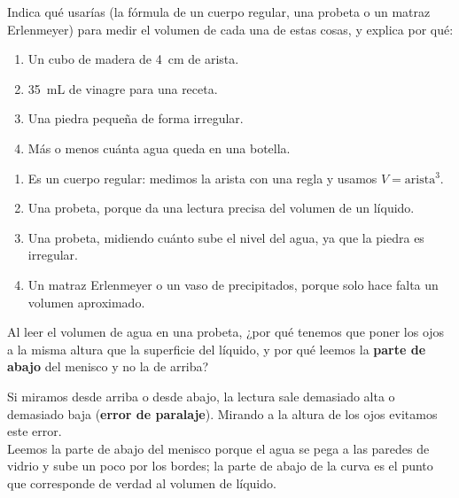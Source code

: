 \begin{exercise}
    Indica qué usarías (la fórmula de un cuerpo regular, una probeta o un matraz Erlenmeyer) para medir el volumen de cada una de estas cosas, y explica por qué:
    \begin{enumerate}[label=\letraminuscula]
        \item Un cubo de madera de \qty{4}{\cm} de arista.
        \item \qty{35}{\mL} de vinagre para una receta.
        \item Una piedra pequeña de forma irregular.
        \item Más o menos cuánta agua queda en una botella.
    \end{enumerate}
    \begin{solu}
        \begin{enumerate}[label=\alph*)]
            \item Es un cuerpo regular: medimos la arista con una regla y usamos \(V = \text{arista}^3\).
            \item Una probeta, porque da una lectura precisa del volumen de un líquido.
            \item Una probeta, midiendo cuánto sube el nivel del agua, ya que la piedra es irregular.
            \item Un matraz Erlenmeyer o un vaso de precipitados, porque solo hace falta un volumen aproximado.
        \end{enumerate}
    \end{solu}
\end{exercise}

\begin{exercise}
    Al leer el volumen de agua en una probeta, ¿por qué tenemos que poner los ojos a la misma altura que la superficie del líquido, y por qué leemos la \textbf{parte de abajo} del menisco y no la de arriba?
    \begin{solu}
        Si miramos desde arriba o desde abajo, la lectura sale demasiado alta o demasiado baja (\textbf{error de paralaje}). Mirando a la altura de los ojos evitamos este error. \\
        Leemos la parte de abajo del menisco porque el agua se pega a las paredes de vidrio y sube un poco por los bordes; la parte de abajo de la curva es el punto que corresponde de verdad al volumen de líquido.
    \end{solu}
\end{exercise}


